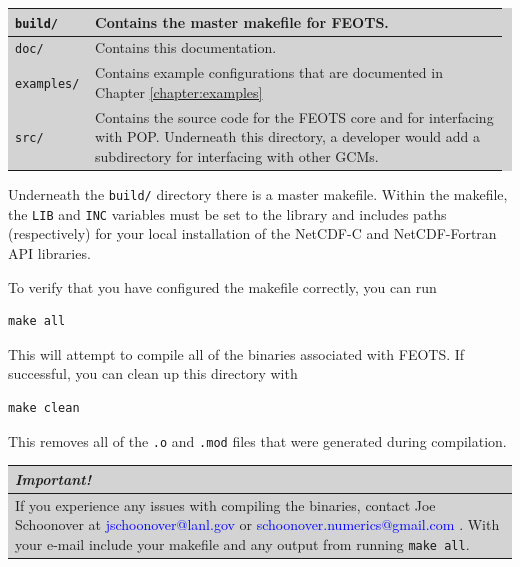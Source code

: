 \documentclass{softwaremanual}
\begin{document}
\vspace{0.5cm}
\begingroup\setlength{\fboxsep}{0pt}
  \colorbox{lightgray}{
    \begin{tabular}{p{0.15\linewidth} | p{0.825\linewidth}}
    \toprule
    \texttt{build/} & Contains the master makefile for FEOTS.\\
    \midrule
    \texttt{doc/} & Contains this documentation. \\
    \midrule
    \texttt{examples/} & Contains example configurations that are documented in Chapter \ref{chapter:examples}\\
    \midrule
    \texttt{src/} & Contains the source code for the FEOTS core and for interfacing with POP. Underneath this directory, a developer would add a subdirectory for interfacing with other GCMs. \\
    \bottomrule
\end{tabular}
}\endgroup
\vspace{0.5cm}

Underneath the \texttt{build/} directory there is a master makefile. Within the makefile, the \texttt{LIB} and \texttt{INC} variables must be set to the library and includes paths (respectively) for your local installation of the NetCDF-C and NetCDF-Fortran API libraries.

To verify that you have configured the makefile correctly, you can run
\begin{verbatim}
make all
\end{verbatim}
This will attempt to compile all of the binaries associated with FEOTS. If successful, you can clean up this directory with 
\begin{verbatim}
make clean
\end{verbatim}
This removes all of the \texttt{.o} and \texttt{.mod} files that were generated during compilation.

\begin{flushleft}
\begingroup\setlength{\fboxsep}{0pt}
  \colorbox{lightgray}{
    \begin{tabular}{p{\textwidth}}
    \textbf{\textit{Important!}}\\
    \midrule
    If you experience any issues with compiling the binaries, contact Joe Schoonover at \textcolor{blue}{jschoonover@lanl.gov} or \textcolor{blue}{schoonover.numerics@gmail.com} . With your e-mail include your makefile and any output from running \texttt{make all}. \\
    \bottomrule
\end{tabular}
}\endgroup
\end{flushleft}
\vspace{0.5cm}
\end{document}
